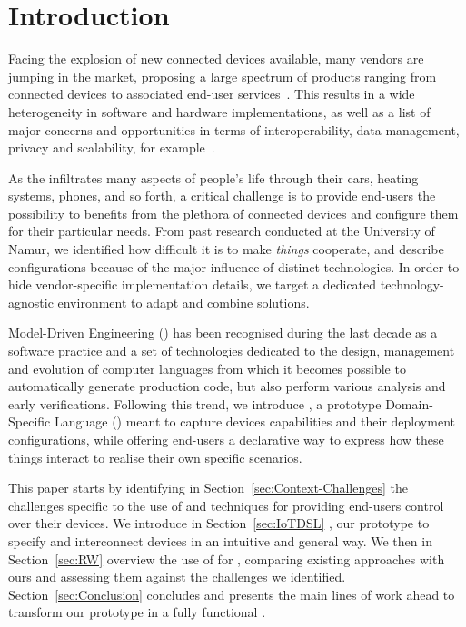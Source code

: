 \section{Introduction}
\label{sec:Introduction}

Facing the explosion of new connected devices available, many vendors are jumping in the market, proposing a large spectrum of products ranging from connected devices to associated end-user services~\cite{lee-15}. This results in a wide heterogeneity in software and hardware implementations, as well as a list of major concerns and opportunities in terms of interoperability, data management, privacy and scalability, for example~\cite{chaqfeh-12}.

As the \IOT infiltrates many aspects of people's life through their cars, heating systems, phones, and so forth, a critical challenge is to provide end-users the possibility to benefits from the plethora of connected devices and configure them for their particular needs. From past research conducted at the University of Namur, we identified how difficult it is to make \textit{things} cooperate, and describe configurations because of the major influence of distinct technologies. In order to hide vendor-specific implementation details, we target a dedicated technology-agnostic environment to adapt and combine \IOT solutions.

Model-Driven Engineering (\MDE) has been recognised during the last decade as a software practice and a set of technologies dedicated to the design, management and evolution of computer languages from which it becomes possible to automatically generate production code, but also perform various analysis and early verifications. Following this trend, we introduce \IOTDSL, a prototype Domain-Specific Language (\DSL) meant to capture \IOT devices capabilities and their deployment configurations, while offering end-users a declarative way to express how these things interact to realise their own specific scenarios.

This paper starts by identifying in Section~\ref{sec:Context-Challenges} the \IOT challenges specific to the use of \DSLS and \MDE techniques for providing end-users control over their devices. We introduce in Section~\ref{sec:IoTDSL} \IOTDSL, our prototype \DSL to specify and interconnect devices in an intuitive and general way. We then in Section~\ref{sec:RW} overview the use of \DSLS for \IOT, comparing existing approaches with ours and assessing them against the challenges we identified. Section~\ref{sec:Conclusion} concludes and presents the main lines of work ahead to transform our prototype in a fully functional \DSL.